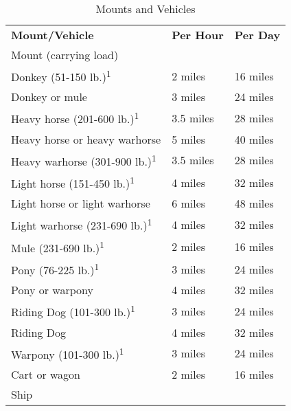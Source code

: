 \begin{table}[htb]
\sffamily
{}
\caption{Mounts and Vehicles}
\centering
\begin{tabular}{l l l}
\textbf{Mount/Vehicle} & \textbf{Per Hour} & \textbf{Per Day}\\
Mount (carrying load) & & \\
\hspace{1cm}Donkey (51-150 lb.)\textsuperscript{1} & 2 miles & 16 miles\\
\hspace{1cm}Donkey or mule & 3 miles & 24 miles\\
\hspace{1cm}Heavy horse (201-600 lb.)\textsuperscript{1} & 3.5 miles & 28 miles\\
\hspace{1cm}Heavy horse or heavy warhorse & 5 miles & 40 miles\\
\hspace{1cm}Heavy warhorse (301-900 lb.)\textsuperscript{1} & 3.5 miles & 28 miles\\
\hspace{1cm}Light horse (151-450 lb.)\textsuperscript{1} & 4 miles & 32 miles\\
\hspace{1cm}Light horse or light warhorse & 6 miles & 48 miles\\
\hspace{1cm}Light warhorse (231-690 lb.)\textsuperscript{1} & 4 miles & 32 miles\\
\hspace{1cm}Mule (231-690 lb.)\textsuperscript{1} & 2 miles & 16 miles\\
\hspace{1cm}Pony (76-225 lb.)\textsuperscript{1} & 3 miles & 24 miles\\
\hspace{1cm}Pony or warpony & 4 miles & 32 miles\\
\hspace{1cm}Riding Dog (101-300 lb.)\textsuperscript{1} & 3 miles & 24 miles\\
\hspace{1cm}Riding Dog & 4 miles & 32 miles\\
\hspace{1cm}Warpony (101-300 lb.)\textsuperscript{1} & 3 miles & 24 miles\\
Cart or wagon & 2 miles & 16 miles\\
Ship & & \\

\end{tabular}
\end{table}
